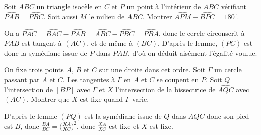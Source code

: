 \begin{exo}
Soit $ABC$ un triangle isocèle en $C$ et $P$ un point à l'intérieur de $ABC$ vérifiant $\widehat{PAB}=\widehat{PBC}$. Soit aussi $M$ le milieu de $ABC$. Montrer $\widehat{APM}+\widehat{BPC}=180^{\circ}$.
\end{exo}

\begin{sol}
On a $\widehat{PAC}=\widehat{BAC}-\widehat{PAB}=\widehat{ABC}-\widehat{PBC}=\widehat{PBA}$, donc le cercle circonscrit à $PAB$ est tangent à $(AC)$, et de même à $(BC)$. D'après le lemme, $(PC)$ est donc la symédiane issue de $P$ dans $PAB$, d'où on déduit aisément l'égalité voulue.
\end{sol}

\begin{exo}
On fixe trois points $A$, $B$ et $C$ sur une droite dans cet ordre. Soit $\Gamma$ un cercle passant par $A$ et $C$. Les tangentes à $\Gamma$ en $A$ et $C$ se coupent en $P$. Soit $Q$ l'intersection de $[BP]$ avec $\Gamma$ et $X$ l'intersection de la bissectrice de $\widehat{AQC}$ avec $(AC)$. Montrer que $X$ est fixe quand $\Gamma$ varie.
\end{exo}

\begin{sol}
D'après le lemme $(PQ)$ est la symédiane issue de $Q$ dans $AQC$ donc son pied est $B$, donc $\frac{BA}{BC}=\Big( \frac{XA}{XC} \Big)^2$, donc $\frac{XA}{XC}$ est fixe et $X$ est fixe.
\end{sol}

%
%

